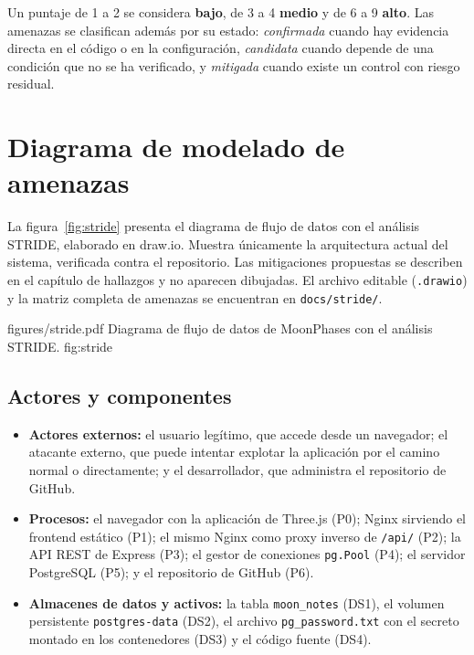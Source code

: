 Un puntaje de 1 a 2 se considera \textbf{bajo}, de 3 a 4 \textbf{medio} y de
6 a 9 \textbf{alto}. Las amenazas se clasifican además por su estado:
\textit{confirmada} cuando hay evidencia directa en el código o en la
configuración, \textit{candidata} cuando depende de una condición que no se
ha verificado, y \textit{mitigada} cuando existe un control con riesgo
residual.

\section{Diagrama de modelado de amenazas}

La figura~\ref{fig:stride} presenta el diagrama de flujo de datos con el
análisis STRIDE, elaborado en draw.io. Muestra únicamente la arquitectura
actual del sistema, verificada contra el repositorio. Las mitigaciones
propuestas se describen en el capítulo de hallazgos y no aparecen dibujadas.
El archivo editable (\texttt{.drawio}) y la matriz completa de amenazas se
encuentran en \texttt{docs/stride/}.

\begin{landscape}
\evidencefigure
{figures/stride.pdf}
{Diagrama de flujo de datos de MoonPhases con el análisis STRIDE.}
{fig:stride}
\end{landscape}

\subsection{Actores y componentes}

\begin{itemize}
    \item \textbf{Actores externos:} el usuario legítimo, que accede desde un
    navegador; el atacante externo, que puede intentar explotar la
    aplicación por el camino normal o directamente; y el desarrollador, que
    administra el repositorio de GitHub.
    \item \textbf{Procesos:} el navegador con la aplicación de Three.js (P0);
    Nginx sirviendo el frontend estático (P1); el mismo Nginx como proxy
    inverso de \texttt{/api/} (P2); la API REST de Express (P3); el gestor
    de conexiones \texttt{pg.Pool} (P4); el servidor PostgreSQL (P5); y el
    repositorio de GitHub (P6).
    \item \textbf{Almacenes de datos y activos:} la tabla
    \texttt{moon\_notes} (DS1), el volumen persistente
    \texttt{postgres-data} (DS2), el archivo \texttt{pg\_password.txt} con el
    secreto montado en los contenedores (DS3) y el código fuente (DS4).
\end{itemize}


